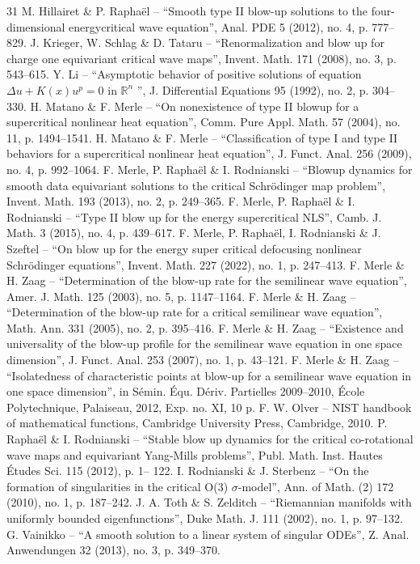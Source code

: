 \begin{thebibliography}{31}
 M. Hillairet \& P. Raphaël – “Smooth type II blow-up solutions to the four-dimensional energycritical wave equation”, Anal. PDE 5 (2012), no. 4, p. 777–829.
 J. Krieger, W. Schlag \& D. Tataru – “Renormalization and blow up for charge one equivariant critical wave maps”, Invent. Math. 171 (2008), no. 3, p. 543–615.
 Y. Li – “Asymptotic behavior of positive solutions of equation $\Delta u+K(x)u^p=0$ in $\mathbb R^n$ ”, J. Differential Equations 95 (1992), no. 2, p. 304–330.
 H. Matano \& F. Merle – “On nonexistence of type II blowup for a supercritical nonlinear heat equation”, Comm. Pure Appl. Math. 57 (2004), no. 11, p. 1494–1541.
 H. Matano \& F. Merle – “Classification of type I and type II behaviors for a supercritical nonlinear heat equation”, J. Funct. Anal. 256 (2009), no. 4, p. 992–1064.
 F. Merle, P. Raphaël \& I. Rodnianski – “Blowup dynamics for smooth data equivariant solutions to the critical Schrödinger map problem”, Invent. Math. 193 (2013), no. 2, p. 249–365.
 F. Merle, P. Raphaël \& I. Rodnianski – “Type II blow up for the energy supercritical NLS”, Camb. J. Math. 3 (2015), no. 4, p. 439–617.
 F. Merle, P. Raphaël, I. Rodnianski \& J. Szeftel – “On blow up for the energy super critical defocusing nonlinear Schrödinger equations”, Invent. Math. 227 (2022), no. 1, p. 247–413.
 F. Merle \& H. Zaag – “Determination of the blow-up rate for the semilinear wave equation”, Amer. J. Math. 125 (2003), no. 5, p. 1147–1164.
 F. Merle \& H. Zaag – “Determination of the blow-up rate for a critical semilinear wave equation”, Math. Ann. 331 (2005), no. 2, p. 395–416.
 F. Merle \& H. Zaag – “Existence and universality of the blow-up profile for the semilinear wave equation in one space dimension”, J. Funct. Anal. 253 (2007), no. 1, p. 43–121.
 F. Merle \& H. Zaag – “Isolatedness of characteristic points at blow-up for a semilinear wave equation in one space dimension”, in Sémin. Équ. Dériv. Partielles 2009–2010, École Polytechnique, Palaiseau, 2012, Exp. no. XI, 10 p.
 F. W. Olver – NIST handbook of mathematical functions, Cambridge University Press, Cambridge, 2010.
 P. Raphaël \& I. Rodnianski – “Stable blow up dynamics for the critical co-rotational wave maps and equivariant Yang-Mills problems”, Publ. Math. Inst. Hautes Études Sci. 115 (2012), p. 1– 122.
 I. Rodnianski \& J. Sterbenz – “On the formation of singularities in the critical O(3) $\sigma$-model”, Ann. of Math. (2) 172 (2010), no. 1, p. 187–242.
 J. A. Toth \& S. Zelditch – “Riemannian manifolds with uniformly bounded eigenfunctions”, Duke Math. J. 111 (2002), no. 1, p. 97–132.
 G. Vainikko – “A smooth solution to a linear system of singular ODEs”, Z. Anal. Anwendungen 32 (2013), no. 3, p. 349–370.
\end{thebibliography}
